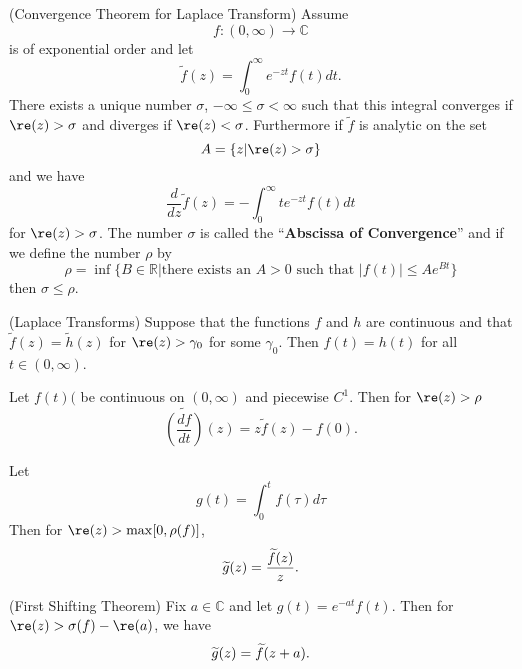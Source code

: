 \begin{thm}{(Convergence Theorem for Laplace Transform) }%
Assume
\begin{equation}%
f:(0,\infty)\to\mathbb{C}
\end{equation}
is of exponential order and let
\begin{equation}%
\widetilde{f}(z) = \int^{\infty}_{0}e^{-zt}f(t)dt.
\end{equation}
There exists a unique number $\sigma$, $-\infty\leq\sigma<\infty$
such that this integral converges if $\re(z)>\sigma$ and diverges
if $\re(z)<\sigma$. Furthermore if $\widetilde{f}$ is analytic on
the set
\begin{equation}%
A = \{z|\re(z)>\sigma\}
\end{equation}
and we have
\begin{equation}%
\frac{d}{dz}\widetilde{f}(z) = -\int^{\infty}_{0}te^{-zt}f(t)dt
\end{equation}
for $\re(z)>\sigma$. The number $\sigma$ is called the
``\textbf{Abscissa of Convergence}'' and if we define the number
$\rho$ by 
\begin{equation}%
\rho=\inf\{B\in\mathbb{R}|\text{there exists an }A>0\text{ such
  that }|f(t)|\leq Ae^{Bt}\}
\end{equation}
then $\sigma\leq\rho$.
\end{thm}
\begin{thm}{(Laplace Transforms)}
Suppose that the functions $f$ and $h$ are continuous and that
$\widetilde{f}(z)=\widetilde{h}(z)$ for $\re(z)>\gamma_0$ for
some $\gamma_0$. Then $f(t)=h(t)$ for all $t\in(0,\infty)$.
\end{thm}
\begin{prop}%
Let $f(t)($ be continuous on $(0,\infty)$ and piecewise
$C^1$. Then for $\re(z)>\rho$
\begin{equation}%
\widetilde{\left(\frac{df}{dt}\right)}(z)=z\widetilde{f}(z)-f(0).
\end{equation}
\end{prop}
\begin{prop}%
Let
\begin{equation}%
g(t)=\int^{t}_{0}f(\tau)d\tau
\end{equation}
Then for $\re(z)>\max[0,\rho(f)]$,
\begin{equation}%
\wt{g}(z) = \frac{\wt{f}(z)}{z}.
\end{equation}
\end{prop}
\begin{thm}{(First Shifting Theorem)}%
Fix $a\in\mathbb{C}$ and let $g(t)=e^{-at}f(t)$. Then for
$\re(z)>\sigma(f)-\re(a)$, we have
\begin{equation}%
\wt{g}(z)=\wt{f}(z+a).
\end{equation}
\end{thm}

